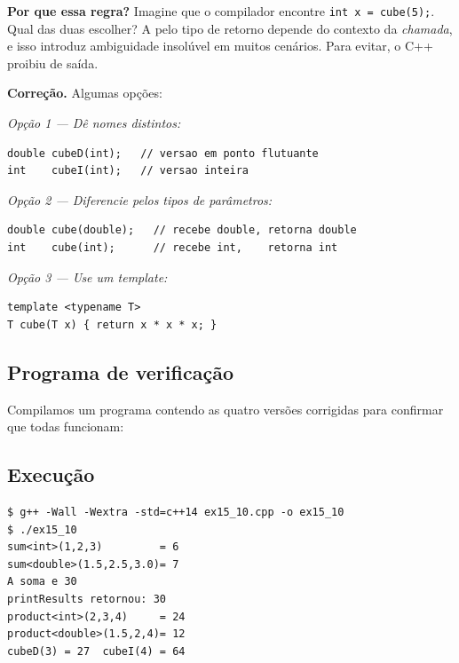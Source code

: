 \documentclass[11pt,a4paper]{article}
\begin{document}
\textbf{Por que essa regra?} Imagine que o compilador encontre \texttt{int x = cube(5);}. Qual das duas escolher? A pelo tipo de retorno depende do contexto da \emph{chamada}, e isso introduz ambiguidade insol\'uvel em muitos cen\'arios. Para evitar, o C++ proibiu de sa\'ida.

\textbf{Corre\c{c}\~ao.} Algumas op\c{c}\~oes:

\textit{Op\c{c}\~ao 1 --- D\^e nomes distintos:}
\begin{lstlisting}[style=cppcode,numbers=none]
double cubeD(int);   // versao em ponto flutuante
int    cubeI(int);   // versao inteira
\end{lstlisting}

\textit{Op\c{c}\~ao 2 --- Diferencie pelos tipos de par\^ametros:}
\begin{lstlisting}[style=cppcode,numbers=none]
double cube(double);   // recebe double, retorna double
int    cube(int);      // recebe int,    retorna int
\end{lstlisting}

\textit{Op\c{c}\~ao 3 --- Use um template:}
\begin{lstlisting}[style=cppcode,numbers=none]
template <typename T>
T cube(T x) { return x * x * x; }
\end{lstlisting}

\subsection*{Programa de verifica\c{c}\~ao}

Compilamos um programa contendo as quatro vers\~oes corrigidas para confirmar que todas funcionam:



\subsection*{Execu\c{c}\~ao}

\begin{saidabox}
\begin{lstlisting}[style=terminal]
$ g++ -Wall -Wextra -std=c++14 ex15_10.cpp -o ex15_10
$ ./ex15_10
sum<int>(1,2,3)         = 6
sum<double>(1.5,2.5,3.0)= 7
A soma e 30
printResults retornou: 30
product<int>(2,3,4)     = 24
product<double>(1.5,2,4)= 12
cubeD(3) = 27  cubeI(4) = 64
\end{lstlisting}
\end{saidabox}
\end{document}
